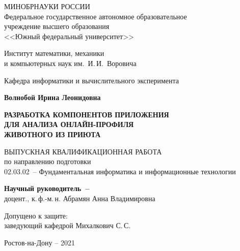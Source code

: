 


\thispagestyle{empty}
\begin{singlespacing}
\begin{center}

МИНОБРНАУКИ РОССИИ\\ [12pt]
Федеральное государственное автономное образовательное\\
учреждение высшего образования\\
<<Южный федеральный университет>>

\vspace{\baselineskip}
Институт математики, механики\\
и компьютерных наук им.~И.\,И.~Воровича

\vspace{\baselineskip}
Кафедра информатики и вычислительного эксперимента

\vfill
\textbf{Волнобой Ирина Леонидовна}

\vspace{\baselineskip}
{\bf РАЗРАБОТКА КОМПОНЕНТОВ ПРИЛОЖЕНИЯ \\
ДЛЯ АНАЛИЗА ОНЛАЙН-ПРОФИЛЯ \\
ЖИВОТНОГО ИЗ ПРИЮТА }


\vspace{15mm}
ВЫПУСКНАЯ КВАЛИФИКАЦИОННАЯ РАБОТА\\
по направлению подготовки\\
02.03.02~-- Фундаментальная информатика и информационные технологии


\vspace{10mm}
\textbf{Научный руководитель~--}\\
доцент., к.\,ф.-м.\,н. Абрамян Анна Владимировна

\vspace{15mm}

\noindent
\begin{flushleft}
Допущено к защите:\\
заведующий кафедрой \underline{\hspace*{65mm}} Михалкович С.\,С.
\end{flushleft}




\vfill
Ростов-на-Дону -- 2021

\end{center}

\singlespacing
\end{singlespacing} 